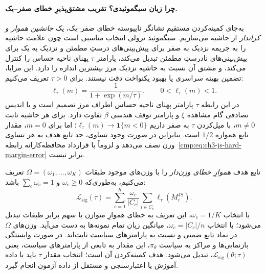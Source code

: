 \paragraph{چرا زیان سیگموئیدی؟ تقریب مشتق‌پذیرِ خطای صفر--یک.}
به‌جای کمینه‌کردن مستقیم نشانگر ناپیوسته خطای صفر--یک،
یک \emph{جانشین هموار و کراندار} از حاشیه می‌سازیم.
سیگموئید نزولی انتخاب مناسبی است چون
علامت حاشیه را به جریمه نزدیک به صفر برای
پیش‌بینی‌های درستِ مطمئن و نزدیک به یک برای
پیش‌بینی‌های نادرستِ مطمئن تبدیل می‌کند،
پارامتر $\tau$ پهنای ناحیه حساس را کنترل می‌کند،
و مشتق آن نسبت به حاشیه نزدیک مرز بیشترین اندازه را دارد.
این مزایا، تضمین بهینه سراسری یا بهبود یکنواخت دقت نیستند.
برای $\tau>0$ تعریف می‌کنیم:
\begin{equation}\label{cmp:eq:ch3-js-sigmoid-loss}
\boxed{
\ell_\tau(m)=\frac{1}{1+\exp(m/\tau)},
\qquad 0<\ell_\tau(m)<1.
}
\end{equation}
در این رابطه $\tau$ پارامتر پهنای ناحیه حساس اطراف مرز تصمیم است و با اندیس تصادفی گام مشاهده $\xi$ و پارامتر توقف هندسی $\beta$ تفاوت دارد. برای هر حاشیه ثابت $m\ne0$، با میل‌کردن $\tau$ به صفر داریم
$\ell_\tau(m)\to\mathbf1\{m<0\}$؛ اما برای $m=0$، مقدار تابع همواره $1/2$ است. بنابراین در صورت وجود تساوی، حد تابع هدف به هر تساوی وزن نصف می‌دهد و لزوماً با قرارداد محافظه‌کارانه رابطه~\eqref{cmp:eq:ch3-js-hard-margin-error} برابر نیست.

تابع هدف \emph{هموارِ خطای وزن‌دار} را با وزن‌های موجود طبقات $\Omega=(\omega_1,\ldots,\omega_K)$ تعریف می‌کنیم، به‌طوری‌که $\omega_c\ge0$ و $\sum_c\omega_c=1$ باشد:
\begin{equation}\label{cmp:eq:ch3-js-sigmoid-balanced-objective}
\boxed{
\mathcal L_{\mathrm{sig}}(\tau)
=\sum_{c=1}^{K}\frac{\omega_c}{|C_c|}
\sum_{i\in C_c}\ell_\tau(M_i^{\mathrm{JS}}).
}
\end{equation}
با انتخاب $\omega_c=1/K$، این تعریف به خطای هموارِ متوازن با سهم برابر طبقات تبدیل می‌شود؛ با انتخاب $\omega_c=|C_c|/n$، میانگین زیان تمام نمونه‌ها به دست می‌آید. وزن‌های $\Omega$ در نماد تابع ضمنی و نسبت به پارامترهای سیاست ثابت‌اند.
در صورت وابستگی بازنمایی‌ها و مراکز به سیاست $\pi_\theta$، این مقدار به تابعی از پارامترهای سیاست، یعنی $\mathcal L_{\mathrm{sig}}(\theta;\tau)$، تبدیل می‌شود. هدف کمینه‌کردن آن است؛ انتخاب مقدار $\tau$ باید با داده آموزش یا اعتبارسنجی و مستقل از داده آزمون انجام گیرد.

